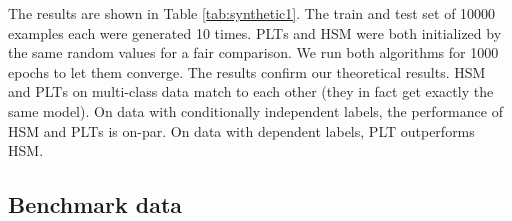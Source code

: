 \documentclass{article}
\newcommand{\Algo}[1]{\textsc{#1}}
\begin{document}
The results are shown in Table \ref{tab:synthetic1}. The train and test set of 10000 examples each were generated 10 times. \Algo{PLT}s and \Algo{HSM} were both initialized by the same random values for a fair comparison. We run both algorithms for 1000 epochs to let them converge. 
The results confirm our theoretical results. \Algo{HSM} and \Algo{PLT}s on multi-class data match to each other (they in fact get exactly the same model). On data with conditionally independent labels, the performance of \Algo{HSM} and \Algo{PLT}s is on-par. %
On data with dependent labels, \Algo{PLT} outperforms \Algo{HSM}. 


\subsection{Benchmark data}
\end{document}
